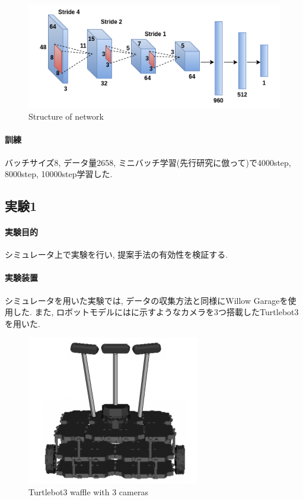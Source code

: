 \vspace{5mm}
\begin{figure}[h]
  \centering
  \includegraphics[keepaspectratio, scale=0.6]{images/cnn.png}
  \caption{Structure of network}
  \label{Fig:cnn}
  \end{figure}

\paragraph{訓練}
バッチサイズ8, データ量2658, ミニバッチ学習(先行研究に倣って)で4000step, 8000step, 10000step学習した.

\subsection{実験1}
\paragraph{実験目的}
シミュレータ上で実験を行い, 提案手法の有効性を検証する.

\paragraph{実験装置}
シミュレータを用いた実験では, データの収集方法と同様にWillow Garageを使用した. また, ロボットモデルにはに示すようなカメラを3つ搭載したTurtlebot3\cite{turtlebot3}を用いた. 

\begin{figure}[h]
  \centering
  \includegraphics[keepaspectratio, scale=0.55]{images/turtlebot3.png}
  \caption{Turtlebot3 waffle with 3 cameras}
  \label{Fig:turtlebot3}
  \end{figure}

